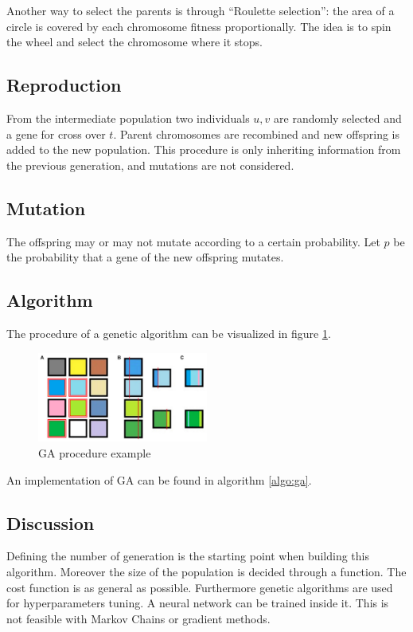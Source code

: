   Another way to select the parents is through ``Roulette selection'': the area of a circle is covered by each chromosome fitness proportionally.
  The idea is to spin the wheel and select the chromosome where it stops.

  \subsection{Reproduction}
  From the intermediate population two individuals \(u,v\) are randomly selected and a gene for cross over \(t\).
  Parent chromosomes are recombined and new offspring is added to the new population.
  This procedure is only inheriting information from the previous generation, and mutations are not considered.

  \subsection{Mutation}
  The offspring may or may not mutate according to a certain probability.
  Let \(p\) be the probability that a gene of the new offspring mutates.

  \subsection{Algorithm}
  The procedure of a genetic algorithm can be visualized in figure \ref{fig:ga-process}.

  \begin{figure}[H]
    \centering
    \includegraphics[width=0.5\textwidth]{ga_process.png}
    \caption{GA procedure example}
    \label{fig:ga-process}
  \end{figure}

  An implementation of GA can be found in algorithm \ref{algo:ga}.

  

  \subsection{Discussion}
  Defining the number of generation is the starting point when building this algorithm.
  Moreover the size of the population is decided through a function.
  The cost function is as general as possible.
  Furthermore genetic algorithms are used for hyperparameters tuning.
  A neural network can be trained inside it.
  This is not feasible with Markov Chains or gradient methods.

